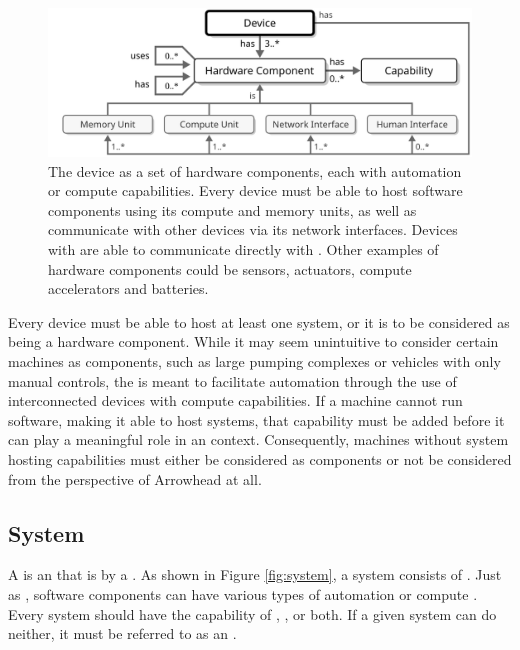 \vfill

\begin{figure}[ht!]
  \centering
  \includegraphics[scale=0.9]{figures/device}
  \caption{
    The device as a set of hardware components, each with automation or compute capabilities.
    Every device must be able to host software components using its compute and memory units, as well as communicate with other devices via its network interfaces.
    Devices with  are able to communicate directly with .
    Other examples of hardware components could be sensors, actuators, compute accelerators and batteries.
  }
  \label{fig:device}
\end{figure}

Every device must be able to host at least one system, or it is to be considered as being a hardware component.
While it may seem unintuitive to consider certain machines as components, such as large pumping complexes or vehicles with only manual controls, the  is meant to facilitate automation through the use of interconnected devices with compute capabilities.
If a machine cannot run software, making it able to host systems, that capability must be added before it can play a meaningful role in an  context.
Consequently, machines without system hosting capabilities must either be considered as components or not be considered from the perspective of Arrowhead at all.

\newpage

\subsection{System}
\label{sec:concepts:system}

A  is an   that is  by a .
As shown in Figure \ref{fig:system}, a system consists of .
Just as , software components can have various types of automation or compute .
Every system should have the capability of , , or both.
If a given system can do neither, it must be referred to as an .

